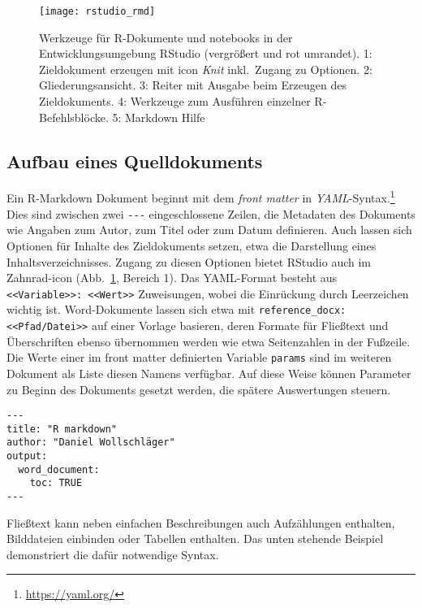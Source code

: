\begin{figure}[ht]
\centering
\texttt{[image: rstudio\_rmd]}
\vspace*{-0.5em}
\caption{Werkzeuge für R-Dokumente und notebooks in der Entwicklungsumgebung RStudio (vergrößert und rot umrandet). 1: Zieldokument erzeugen mit icon \emph{Knit} inkl.\ Zugang zu Optionen. 2: Gliederungsansicht. 3: Reiter mit Ausgabe beim Erzeugen des Zieldokuments. 4: Werkzeuge zum Ausführen einzelner R-Befehlsblöcke. 5: Markdown Hilfe}
\label{fig:rstudio_rmd}
\end{figure}

\subsection{Aufbau eines Quelldokuments}

Ein R-Markdown Dokument beginnt mit dem \emph{front matter} in \emph{YAML}-Syntax.\footnote{\url{https://yaml.org/}} Dies sind zwischen zwei \lstinline!---! eingeschlossene Zeilen, die Metadaten des Dokuments wie Angaben zum Autor, zum Titel oder zum Datum definieren. Auch lassen sich Optionen für Inhalte des Zieldokuments setzen, etwa die Darstellung eines Inhaltsverzeichnisses. Zugang zu diesen Optionen bietet RStudio auch im Zahnrad-icon (Abb.\ \ref{fig:rstudio_rmd}, Bereich 1). Das YAML-Format besteht aus \lstinline!<<Variable>>: <<Wert>>! Zuweisungen, wobei die Einrückung durch Leerzeichen wichtig ist. Word-Dokumente lassen sich etwa mit \lstinline!reference_docx: <<Pfad/Datei>>! auf einer Vorlage basieren, deren Formate für Fließtext und Überschriften ebenso übernommen werden wie etwa Seitenzahlen in der Fußzeile. Die Werte einer im front matter definierten Variable \lstinline!params! sind im weiteren Dokument als Liste diesen Namens verfügbar. Auf diese Weise können Parameter zu Beginn des Dokuments gesetzt werden, die spätere Auswertungen steuern.
\begin{lstlisting}
---
title: "R markdown"
author: "Daniel Wollschläger"
output:
  word_document:
    toc: TRUE
---
\end{lstlisting}

Fließtext kann neben einfachen Beschreibungen auch Aufzählungen enthalten, Bilddateien einbinden oder Tabellen enthalten. Das unten stehende Beispiel demonstriert die dafür notwendige Syntax.

